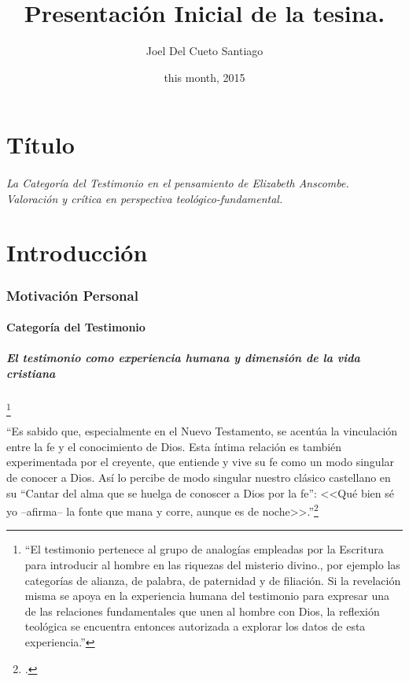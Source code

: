 \documentclass[12pt]{article}
\title{Presentación Inicial de la tesina.}
\author{Joel Del Cueto Santiago}
\date{this month, 2015}
\begin{document}
\reversemarginpar

\part{Título}
\paragraph{\noindent La Categoría del Testimonio en el pensamiento de Elizabeth Anscombe.\\
\emph{Valoración y crítica en perspectiva teológico-fundamental.}}

\part{Introducción}

\section{Motivación Personal}

\subsection{Categoría del Testimonio}

\subsubsection{El testimonio como experiencia humana y dimensión de la vida cristiana}

\footnote{
``El testimonio pertenece al grupo de analogías empleadas por la Escritura para introducir al hombre en las riquezas del misterio divino., por ejemplo las categorías de alianza, de palabra, de paternidad y de filiación. Si la revelación misma se apoya en la experiencia humana del testimonio para expresar una de las relaciones fundamentales que unen al hombre con Dios, la reflexión teológica se encuentra entonces autorizada a explorar los datos de esta experiencia.''\cite[p.~1523]{dicctf}
}

``Es sabido que, especialmente en el Nuevo Testamento, se acentúa la vinculación entre la fe y el conocimiento de Dios. Esta íntima relación es también experimentada por el creyente, que entiende y vive su fe como un modo singular de conocer a Dios. Así lo percibe de modo singular nuestro clásico castellano en su ``Cantar del alma que se huelga de conoscer a Dios por la fe'': <<Qué bien sé yo --afirma-- la fonte que mana y corre, aunque es de noche>>.''\footcite[p.~15]{cyc}
\end{document}
